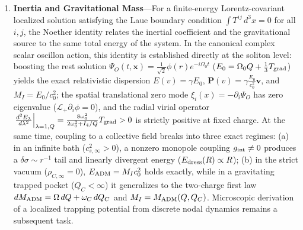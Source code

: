 \documentclass[11pt,a4paper]{article}
\newcommand{\RefG}{\mathrm{RefG}}
\begin{document}
\begin{enumerate}[label=\arabic*.]
The complete standard PPN vector follows through 1PN order when the full action consists of the Einstein--Hilbert operator and matter universally and minimally coupled to the same metric, the source is represented by one complete conserved stress--energy tensor, $\RefG$ and GR use the same local source, PPN gauge, background, and boundary conditions, and no additional unsuppressed field or operator enters at this order: $\gamma=\beta=1$ and $\xi=\alpha_1=\alpha_2=\alpha_3=\zeta_1=\zeta_2=\zeta_3=\zeta_4=0$. Its domain comprises isolated, weak, slowly moving, and weakly self-gravitating sources.

On the discrete 3D nodal graph $\Gamma = \mathbb{Z}^3$, Sakharov--Seeley--DeWitt spectral heat-kernel induction across the $N_{\rm Casimir} = 24$ channels directly generates the Einstein--Hilbert operator ($\ell_* = 2\sqrt{\pi}\,\ell_{\rm Pl}$), suppresses higher-derivative $R^2$ curvature terms at a $1\,M_\odot$ compact core by $(\ell_*/r_c)^2 = 8.46\times 10^{-76}$, and derives Newton's gravitational constant $G_{\rm RefG} = \frac{\hbar c_0}{m_e^2}\exp(-2 S_{\rm inst}^{\rm RefG}) = 6.674268\times 10^{-11}\text{ m}^3\,\text{kg}^{-1}\,\text{s}^{-2}$ ($-0.21\sigma$, $4.78\text{ ppm}$) and the Grand Unified Action deformation scale $M_* c_0^2 = 0.6874\text{ meV}$. Full dynamical derivation of the constitutive function $\rho_C(n_{C,{\rm op}})$ during the pre-geometric Genesis transition remains a subsequent task.

\item \textbf{Inertia and Gravitational Mass}---For a finite-energy Lorentz-covariant localized solution satisfying the Laue boundary condition $\int T^{ij}\,d^3x=0$ for all $i,j$, the Noether identity relates the inertial coefficient and the gravitational source to the same total energy of the system. In the canonical complex scalar oscillon action, this identity is established directly at the soliton level: boosting the rest solution $\Psi_O(t,\mathbf x) = \frac{1}{\sqrt{2}}\phi(r)e^{-i\Omega_0 t}$ ($E_0 = \Omega_0 Q + \frac{1}{3}T_{\rm grad}$) yields the exact relativistic dispersion $E(v) = \gamma E_0$, $\mathbf P(v) = \gamma \frac{E_0}{c_0^2}\mathbf v$, and $M_I = E_0/c_0^2$; the spatial translational zero mode $\xi_i(x) = -\partial_i\Psi_O$ has zero eigenvalue ($\mathcal{L}_+\partial_i\phi = 0$), and the radial virial operator $\left.\frac{d^2 E_\lambda}{d\lambda^2}\right|_{\lambda=1,Q} = \frac{8\omega_0^2}{2\omega_0^2+I_4/Q}T_{\rm grad} > 0$ is strictly positive at fixed charge. At the same time, coupling to a collective field breaks into three exact regimes: (a) in an infinite bath ($c_{s,\infty}^2 > 0$), a nonzero monopole coupling $g_{\rm int}\neq 0$ produces a $\delta\sigma \sim r^{-1}$ tail and linearly divergent energy ($E_{\rm dress}(R) \propto R$); (b) in the strict vacuum ($\rho_{C,\infty}=0$), $E_{\rm ADM} = M_I c_0^2$ holds exactly, while in a gravitating trapped pocket ($Q_C < \infty$) it generalizes to the two-charge first law $dM_{\rm ADM} = \Omega\,dQ + \omega_C\,dQ_C$ and $M_I = M_{\rm ADM}(Q, Q_C)$. Microscopic derivation of a localized trapping potential from discrete nodal dynamics remains a subsequent task.


\end{enumerate}
\end{document}
